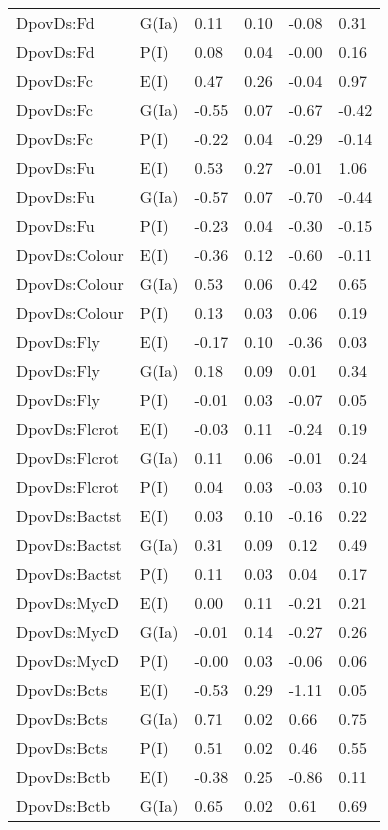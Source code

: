 \begin{center}
\begin{longtable}{|p{1.1in}|p{0.7in}|p{0.7in}|p{0.6in}|p{0.6in}|p{0.6in}|}
  DpovDs:Fd & G(Ia) & 0.11 & 0.10 & -0.08 & 0.31 \\ 
  DpovDs:Fd & P(I) & 0.08 & 0.04 & -0.00 & 0.16 \\ 
  DpovDs:Fc & E(I) & 0.47 & 0.26 & -0.04 & 0.97 \\ 
  DpovDs:Fc & G(Ia) & -0.55 & 0.07 & -0.67 & -0.42 \\ 
  DpovDs:Fc & P(I) & -0.22 & 0.04 & -0.29 & -0.14 \\ 
  DpovDs:Fu & E(I) & 0.53 & 0.27 & -0.01 & 1.06 \\ 
  DpovDs:Fu & G(Ia) & -0.57 & 0.07 & -0.70 & -0.44 \\ 
  DpovDs:Fu & P(I) & -0.23 & 0.04 & -0.30 & -0.15 \\ 
  DpovDs:Colour & E(I) & -0.36 & 0.12 & -0.60 & -0.11 \\ 
  DpovDs:Colour & G(Ia) & 0.53 & 0.06 & 0.42 & 0.65 \\ 
  DpovDs:Colour & P(I) & 0.13 & 0.03 & 0.06 & 0.19 \\ 
  DpovDs:Fly & E(I) & -0.17 & 0.10 & -0.36 & 0.03 \\ 
  DpovDs:Fly & G(Ia) & 0.18 & 0.09 & 0.01 & 0.34 \\ 
  DpovDs:Fly & P(I) & -0.01 & 0.03 & -0.07 & 0.05 \\ 
  DpovDs:Flcrot & E(I) & -0.03 & 0.11 & -0.24 & 0.19 \\ 
  DpovDs:Flcrot & G(Ia) & 0.11 & 0.06 & -0.01 & 0.24 \\ 
  DpovDs:Flcrot & P(I) & 0.04 & 0.03 & -0.03 & 0.10 \\ 
  DpovDs:Bactst & E(I) & 0.03 & 0.10 & -0.16 & 0.22 \\ 
  DpovDs:Bactst & G(Ia) & 0.31 & 0.09 & 0.12 & 0.49 \\ 
  DpovDs:Bactst & P(I) & 0.11 & 0.03 & 0.04 & 0.17 \\ 
  DpovDs:MycD & E(I) & 0.00 & 0.11 & -0.21 & 0.21 \\ 
  DpovDs:MycD & G(Ia) & -0.01 & 0.14 & -0.27 & 0.26 \\ 
  DpovDs:MycD & P(I) & -0.00 & 0.03 & -0.06 & 0.06 \\ 
  DpovDs:Bcts & E(I) & -0.53 & 0.29 & -1.11 & 0.05 \\ 
  DpovDs:Bcts & G(Ia) & 0.71 & 0.02 & 0.66 & 0.75 \\ 
  DpovDs:Bcts & P(I) & 0.51 & 0.02 & 0.46 & 0.55 \\ 
  DpovDs:Bctb & E(I) & -0.38 & 0.25 & -0.86 & 0.11 \\ 
  DpovDs:Bctb & G(Ia) & 0.65 & 0.02 & 0.61 & 0.69 \\ 

\end{longtable}
\end{center}
